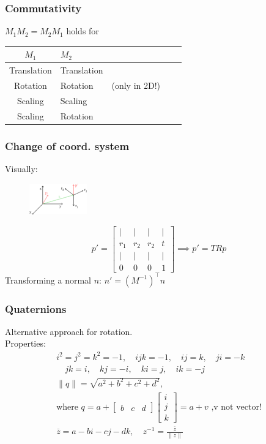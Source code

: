 \documentclass[a4paper,10pt]{article}
\renewcommand*{\arraystretch}{2}
\begin{document}
\subsubsection{Commutativity}
\( M_1 M_{2} = M_{2} M_{1} \) holds for
\begin{center}
    {\renewcommand{\arraystretch}{1.2}
    \begin{tabularx}{\linewidth}{c>{\centering\arraybackslash}Xc>{\centering\arraybackslash}Xc}
	\toprule
	\( M_{1} \) & \( M_{2} \) & \\
	\midrule
	Translation & Translation & \\
	Rotation & Rotation & (only in 2D!) \\
	Scaling & Scaling &\\
	Scaling & Rotation & \\
	\bottomrule
    \end{tabularx}
    }
\end{center}

\subsubsection{Change of coord. system} Visually:

\begin{figure}[h]
    \center
    \includegraphics[width=2.5cm]{coord-system-change.png}
\end{figure}
\[ p' = \left[\begin{smallmatrix} | & | & | & | \\ r_1 & r_2 & r_2 & t \\ | & | & | & | \\ 0 & 0 & 0 & 1 \end{smallmatrix}\right] \implies p' = TRp \]
Transforming a normal \( n \): \( n' = (M^{-1})^\top n \)

\subsubsection{Quaternions} Alternative approach for rotation. \\
Properties:
\begin{align*}
	i^2=j^2=k^2 = -1, \quad ijk = -1, \quad ij=k, \quad ji=-k \\ \quad jk=i, \quad kj = -i, \quad ki = j, \quad ik = -j \\
	\lVert q \rVert = \sqrt{a^2+b^2+c^2+d^2},\\ \text{where } q = a + \left[\begin{smallmatrix} b & c & d \end{smallmatrix}\right] \left[\begin{smallmatrix} i \\ j \\ k \end{smallmatrix}\right] = a + v \text{ ,v not vector!} \\
	\overline{z} = a - bi - cj - dk, \quad z^{-1} = \frac{\overline{z}}{\lVert z \rVert}
\end{align*}
\end{document}
